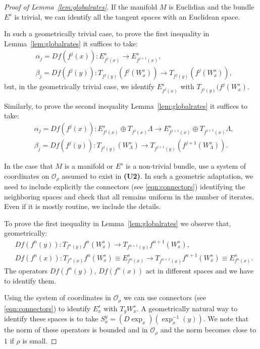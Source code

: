 \documentclass[11pt]{amsart}
\theoremstyle{definition}
\theoremstyle{remark}
\numberwithin{equation}{section}
\newcommand{\OO}{\mathcal{O}}
\begin{document}
\begin{proof}[Proof of Lemma~\ref{lem:globalrates}]

  If the manifold $M$ is Euclidian and the bundle $E^s$ is trivial,
  we can identify all the tangent spaces with an Euclidean
  space.

  In such a geometrically trivial case, to prove the first inequality in
  Lemma~\ref{lem:globalrates} it suffices to take:
  \[
  \begin{split}
    &\alpha_j = Df( f^j(x)): E^s_{f^j(x)} \rightarrow E^s_{f^{j+1}(x)} ,\\
      &\beta_j = Df( f^j(y)): T_{f^j(y)}(f^j(W^s_x) )
      \rightarrow T_{f^j(y)}(f^j(W^s_x)) ,
      \end{split}
        \]
but, in the geometrically trivial case, we identify $E^s_{f^j(x)}$
with  $T_{f^j(y)}(f^j(W^s_x)$.

Similarly, to prove the second inequality
Lemma~\ref{lem:globalrates} it suffices to take:
   \[
  \begin{split}
    &\alpha_j = Df( f^j(x)): E^s_{f^j(x)} \oplus T_{f^j(x)}\Lambda
    \rightarrow E^s_{f^{j+1}(x)} \oplus T_{f^{j+1}(x)}\Lambda , \\
      &\beta_j = Df( f^j(y)): T_{f^j(y)}(W^s_\Lambda)
      \rightarrow T_{f^{j+1}(y)}(f^{j+1}(W^s_\Lambda)) .
      \end{split}
        \]

  In the case that $M$ is a manifold or $E^s$ is a non-trivial bundle,
use a system of coordinates
on $\OO_\rho$
assumed to exist in {\bf (U2)}.
In such a geometric adaptation, we  need to include explicitly
  the connectors (see \eqref{eqn:connectors}) identifying the neighboring spaces and check
  that all remains uniform in the number of iterates.
  Even if it is mostly routine, we include the details.


  To prove the first inequality in Lemma~\ref{lem:globalrates}
  we observe that, geometrically:
  \[
  \begin{split}
   &Df (f^n(y)): T_{f^n(y)}f^n(W^s_x)
\rightarrow T_{f^{n+1}(y)}f^{n+1}(W^s_x), \\
    &Df (f^n(x)): T_{f^n(x)}f^n(W^s_x) \equiv E^s_{f^n(x)}
    \rightarrow T_{f^{n+1}(x)}f^{n+1}(W^s_x) \equiv E^s_{f^n(x)}.
  \end{split}
  \]
  The operators $Df (f^n(y))$, $ Df (f^n(x))$ act in different spaces
  and we have to identify them.

  Using the system of coordinates in $\OO_\rho$ we can use connectors (see \eqref{eqn:connectors})
  to identify $E^s_x$ with  $T_y W^s_x$.
  A geometrically natural way to identify these spaces is
  to take $S_x^y = (D \exp_x)( \exp^{-1}_x(y))$.
  We note that the norm of these operators is bounded
  and  in $\OO_\rho$ and the norm becomes close to $1$
  if $\rho$ is small.



\end{proof}
\end{document}
